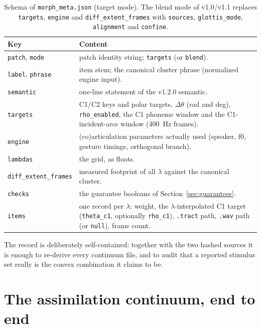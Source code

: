 \documentclass[11pt,a4paper]{article}
\newcommand{\lam}{\lambda}
\newcommand{\code}[1]{\texttt{#1}}
\newcommand{\sectref}[1]{Section~\ref{#1}}
\begin{document}
\begin{table}[t]
\centering\small
\caption{Schema of \code{morph\_meta.json} (target mode).  The blend
mode of v1.0/v1.1 replaces \code{targets}, \code{engine} and
\code{diff\_extent\_frames} with \code{sources}, \code{glottis\_mode},
\code{alignment} and \code{confine}.}\label{tab:meta}
\begin{tabularx}{\textwidth}{@{}l X@{}}
\toprule
Key & Content \\
\midrule
\code{patch}, \code{mode} & patch identity string; \code{targets}
(or \code{blend}). \\
\code{label}, \code{phrase} & item stem; the canonical cluster
phrase (normalized engine input). \\
\code{semantic} & one-line statement of the v1.2.0 semantic. \\
\code{targets} & C1/C2 keys and polar targets, $\Delta\theta$
(rad and deg), \code{rho\_enabled}, the C1 phoneme window and the
C1-incident-arcs window (400~Hz frames). \\
\code{engine} & (co)articulation parameters actually used (speaker,
f0, gesture timings, orthogonal branch). \\
\code{lambdas} & the grid, as floats. \\
\code{diff\_extent\_frames} & measured footprint of all $\lam$
against the canonical cluster. \\
\code{checks} & the guarantee booleans of \sectref{sec:guarantees}. \\
\code{items} & one record per $\lam$: weight, the
$\lam$-interpolated C1 target (\code{theta\_c1}, optionally
\code{rho\_c1}), \code{.tract} path, \code{.wav} path (or
\code{null}), frame count. \\
\bottomrule
\end{tabularx}
\end{table}

The record is deliberately self-contained: together with the two
hashed sources it is enough to re-derive every continuum file, and
to audit that a reported stimulus set really is the convex
combination it claims to be.

\section{The assimilation continuum, end to end}\label{sec:experiment}
\end{document}
